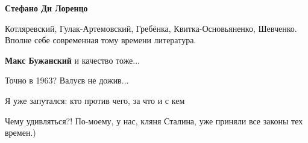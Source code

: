 \begin{itemize}
\begin{itemize}
 
\textbf{Стефано Ди Лоренцо} 

Котляревский, Гулак-Артемовский, Гребёнка, Квитка-Основьяненко, Шевченко.
Вполне себе современная тому времени литература.

 
\textbf{Макс Бужанский} и качество тоже...

\end{itemize}

 
Точно в 1963?
Валуєв не дожив...

 
Я уже запутался: кто против чего, за что и с кем \Smiley[1.0][yellow]

 
Чему удивляться?! По-моему, у нас, кляня Сталина, уже приняли все законы тех времен.)

 



\end{itemize}
